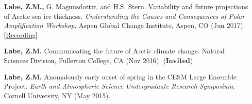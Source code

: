 \documentclass[margin,line,palatino,courier,10pt]{res}
\begin{document}
\begin{resume}
\begin{etaremune}[leftmargin=0in,topsep=0in,parsep=0in]
\item \textbf{Labe, Z.M.,} G. Magnusdottir, and H.S. Stern. Variability and future projections of Arctic sea ice thickness. \textit{Understanding the Causes and Consequences of Polar Amplification Workshop}, Aspen Global Change Institute, Aspen, CO (Jun 2017). \href{https://www.agci.org/lib/17s1/variability-and-future-projections-arctic-sea-ice-thickness}{[Recording]}
\item \textbf{Labe, Z.M.} Communicating the future of Arctic climate change. Natural Sciences Division, Fullerton College, CA (Nov 2016). (\textbf{Invited})
\item \textbf{Labe, Z.M.} Anomalously early onset of spring in the CESM Large Ensemble Project. \textit{Earth and Atmospheric Science Undergraduate Research Symposium}, Cornell University, NY (May 2015). 

\end{etaremune}


\end{resume}
\end{document}
